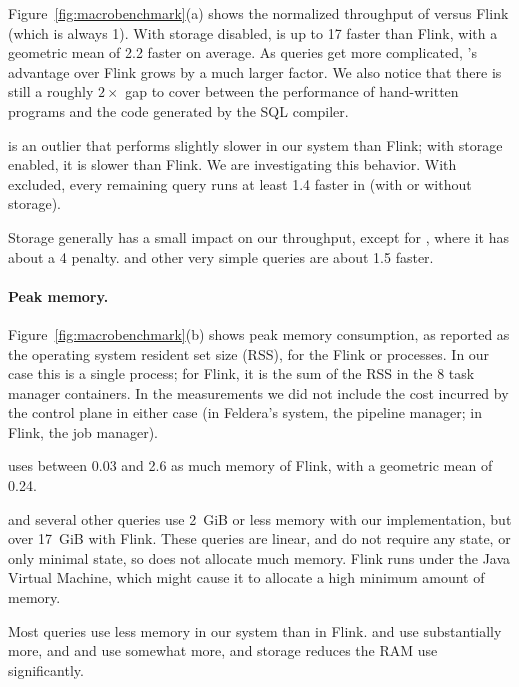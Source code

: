 Figure~\ref{fig:macrobenchmark}(a) shows the normalized throughput of
\dbsp versus Flink (which is always 1).  With storage disabled, \dbsp
is up to 17\x{} faster than Flink, with a geometric mean of 2.2\x{}
faster on average.  As queries get more complicated, \dbsp's advantage
over Flink grows by a much larger factor.  We also notice that there
is still a roughly $2\times{}$ gap to cover between the performance of
hand-written \dbsp programs and the code generated by the SQL
compiler.

 is an outlier that performs slightly slower in our system
than Flink; with storage enabled, it is slower than Flink.  We are
investigating this behavior.  With  excluded, every
remaining query runs at least 1.4\x{} faster in \dbsp (with or without
storage).

Storage generally has a small impact on our throughput, except for
, where it has about a 4\x{} penalty.   and other
very simple queries are about 1.5\x{} faster.

\paragraph{Peak memory.}

Figure~\ref{fig:macrobenchmark}(b) shows peak memory consumption, as
reported as the operating system resident set size (RSS), for the
Flink or \dbsp processes.  In our case this is a single process; for
Flink, it is the sum of the RSS in the 8 task manager containers.  In
the measurements we did not include the cost incurred by the control
plane in either case (in Feldera's system, the pipeline manager; in
Flink, the job manager).

\dbsp uses between 0.03\x{} and 2.6\x{} as much memory of Flink, with a
geometric mean of 0.24\x{}.

 and several other queries use 2~GiB or less memory with our
implementation, but over 17~GiB with Flink.  These queries are linear,
and do not require any state, or only minimal state, so \dbsp does not
allocate much memory.  Flink runs under the Java Virtual Machine,
which might cause it to allocate a high minimum amount of memory.

Most queries use less memory in our system than in Flink.  
and  use substantially more, and  and
 use somewhat more, and storage reduces the RAM use
significantly.
